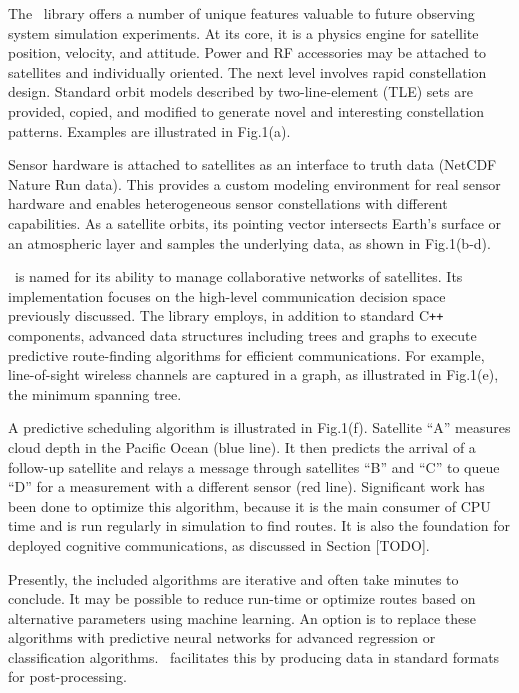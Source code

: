 \documentclass[conference]{IEEEtran}
\newcommand{\project}{{\sc{Collaborate}}~}
\newcommand{\cpp}{C\texttt{++}~}
\begin{document}
The \project library offers a number of unique features valuable to future
observing system simulation experiments.  At its core, it is a physics engine
for satellite position, velocity, and attitude.  Power and RF accessories may be
attached to satellites and individually oriented.  The next level involves rapid
constellation design.  Standard orbit models described by two-line-element (TLE)
sets are provided, copied, and modified to generate novel and interesting
constellation patterns.  Examples are illustrated in Fig.1(a).

Sensor hardware is attached to satellites as an interface to truth data (NetCDF
Nature Run data).  This provides a custom modeling environment for real sensor
hardware and enables heterogeneous sensor constellations with different
capabilities.  As a satellite orbits, its pointing vector intersects Earth's
surface or an atmospheric layer and samples the underlying data, as shown in
Fig.1(b-d).

\project is named for its ability to manage collaborative networks of
satellites.  Its implementation focuses on the high-level communication decision
space previously discussed.  The library employs, in addition to standard \cpp
components, advanced data structures including trees and graphs to execute
predictive route-finding algorithms for efficient communications.  For example,
line-of-sight wireless channels are captured in a graph, as illustrated in
Fig.1(e), the minimum spanning tree.

A predictive scheduling algorithm is illustrated in Fig.1(f).  Satellite ``A''
measures cloud depth in the Pacific Ocean (blue line).  It then predicts the
arrival of a follow-up satellite and relays a message through satellites ``B''
and ``C'' to queue ``D'' for a measurement with a different sensor (red line).
Significant work has been done to optimize this algorithm, because it is the
main consumer of CPU time and is run regularly in simulation to find routes.  It
is also the foundation for deployed cognitive communications, as discussed in
Section [{\color{red}TODO}].

Presently, the included algorithms are iterative and often take minutes to
conclude.  It may be possible to reduce run-time or optimize routes based on
alternative parameters using machine learning.  An option is to replace these
algorithms with predictive neural networks for advanced regression or
classification algorithms.  \project facilitates this by producing data
in standard formats for post-processing.
\end{document}
